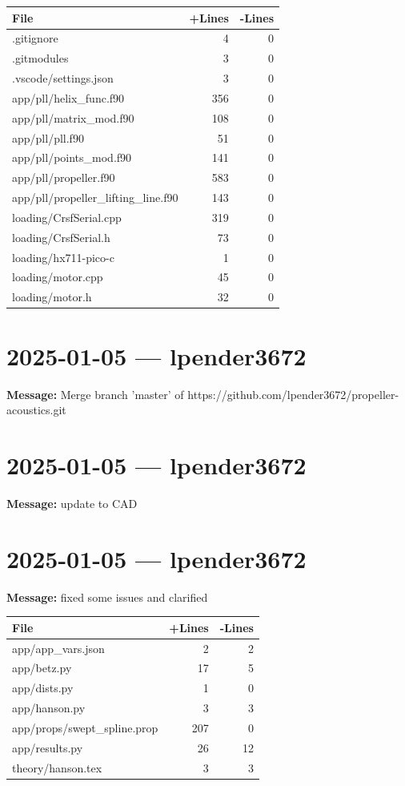 \documentclass{article}
\begin{document}
\begin{longtable}{|p{10cm}|r|r|}
\hline \textbf{File} & \textbf{+Lines} & \textbf{-Lines} \\
\hline
.gitignore & 4 & 0 \\
\hline
.gitmodules & 3 & 0 \\
\hline
.vscode/settings.json & 3 & 0 \\
\hline
app/pll/helix\_func.f90 & 356 & 0 \\
\hline
app/pll/matrix\_mod.f90 & 108 & 0 \\
\hline
app/pll/pll.f90 & 51 & 0 \\
\hline
app/pll/points\_mod.f90 & 141 & 0 \\
\hline
app/pll/propeller.f90 & 583 & 0 \\
\hline
app/pll/propeller\_lifting\_line.f90 & 143 & 0 \\
\hline
loading/CrsfSerial.cpp & 319 & 0 \\
\hline
loading/CrsfSerial.h & 73 & 0 \\
\hline
loading/hx711-pico-c & 1 & 0 \\
\hline
loading/motor.cpp & 45 & 0 \\
\hline
loading/motor.h & 32 & 0 \\
\hline
\end{longtable}

\section*{2025-01-05 --- lpender3672}
\textbf{Message:} Merge branch 'master' of https://github.com/lpender3672/propeller-acoustics.git

\section*{2025-01-05 --- lpender3672}
\textbf{Message:} update to CAD

\section*{2025-01-05 --- lpender3672}
\textbf{Message:} fixed some issues and clarified

\begin{longtable}{|p{10cm}|r|r|}
\hline \textbf{File} & \textbf{+Lines} & \textbf{-Lines} \\
\hline
app/app\_vars.json & 2 & 2 \\
\hline
app/betz.py & 17 & 5 \\
\hline
app/dists.py & 1 & 0 \\
\hline
app/hanson.py & 3 & 3 \\
\hline
app/props/swept\_spline.prop & 207 & 0 \\
\hline
app/results.py & 26 & 12 \\
\hline
theory/hanson.tex & 3 & 3 \\
\hline
\end{longtable}
\end{document}
